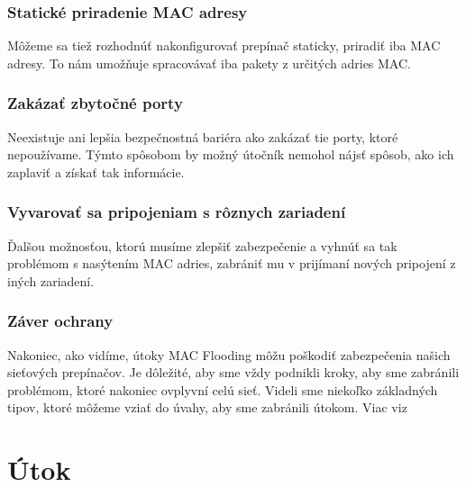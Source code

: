 \subsection{Statické priradenie MAC adresy}
Môžeme sa tiež rozhodnúť nakonfigurovať prepínač staticky, priradiť iba MAC adresy. To nám umožňuje spracovávať iba pakety z určitých adries MAC.
\subsection{Zakázať zbytočné porty}
Neexistuje ani lepšia bezpečnostná bariéra ako zakázať tie porty, ktoré nepoužívame. Týmto spôsobom by možný útočník nemohol nájsť spôsob, ako ich zaplaviť a získať tak informácie.
\subsection{Vyvarovať sa pripojeniam s rôznych zariadení}
Ďalšou možnosťou, ktorú musíme zlepšiť zabezpečenie a vyhnúť sa tak problémom s nasýtením MAC adries, zabrániť mu v prijímaní nových pripojení z iných zariadení.
\subsection{Záver ochrany}
Nakoniec, ako vidíme, útoky MAC Flooding môžu poškodiť zabezpečenia našich sieťových prepínačov. Je dôležité, aby sme vždy podnikli kroky, aby sme zabránili problémom, ktoré nakoniec ovplyvní celú sieť. Videli sme niekoľko základných tipov, ktoré môžeme vziať do úvahy, aby sme zabránili útokom. Viac viz \cite{ochrana}
\chapter{Útok}

